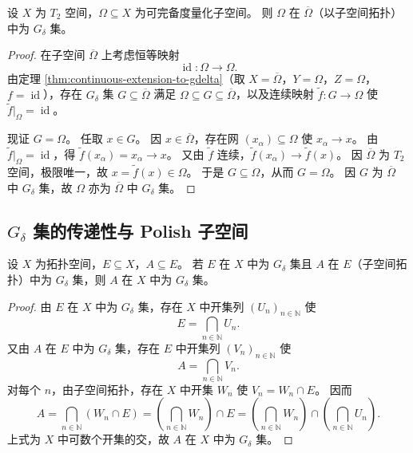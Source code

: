 \documentclass[lang=cn,a4paper,newtx,figureplace=section,tableplace=section]{elegantbook}
\begin{document}
\begin{theorem}\label{thm:completely-metrizable-gdelta-in-closure}
  设 $X$ 为 $T_2$ 空间，$\Omega\subseteq X$ 为可完备度量化子空间。
  则 $\Omega$ 在 $\overline{\Omega}$（以子空间拓扑）中为 $G_\delta$ 集。
\end{theorem}
\begin{proof}
  在子空间 $\overline{\Omega}$ 上考虑恒等映射
  \[
    \operatorname{id}:\Omega\to\Omega.
  \]
  由定理 \ref{thm:continuous-extension-to-gdelta}（取 $X=\overline{\Omega}$，$Y=\Omega$，$Z=\Omega$，$f=\operatorname{id}$），存在 $G_\delta$ 集 $G\subseteq\overline{\Omega}$ 满足 $\Omega\subseteq G\subseteq\overline{\Omega}$，以及连续映射 $\widetilde f:G\to\Omega$ 使 $\widetilde f\vert_{\Omega}=\operatorname{id}$。

  现证 $G=\Omega$。
  任取 $x\in G$。
  因 $x\in\overline{\Omega}$，存在网 $(x_\alpha)\subseteq\Omega$ 使 $x_\alpha\to x$。
  由 $\widetilde f\vert_{\Omega}=\operatorname{id}$，得 $\widetilde f(x_\alpha)=x_\alpha\to x$。
  又由 $\widetilde f$ 连续，$\widetilde f(x_\alpha)\to\widetilde f(x)$。
  因 $\overline{\Omega}$ 为 $T_2$ 空间，极限唯一，故 $x=\widetilde f(x)\in\Omega$。
  于是 $G\subseteq\Omega$，从而 $G=\Omega$。
  因 $G$ 为 $\overline{\Omega}$ 中 $G_\delta$ 集，故 $\Omega$ 亦为 $\overline{\Omega}$ 中 $G_\delta$ 集。
\end{proof}

\subsection{$G_\delta$ 集的传递性与 Polish 子空间}

\begin{proposition}\label{prop:gdelta-transitivity}
  设 $X$ 为拓扑空间，$E\subseteq X$，$A\subseteq E$。
  若 $E$ 在 $X$ 中为 $G_\delta$ 集且 $A$ 在 $E$（子空间拓扑）中为 $G_\delta$ 集，则 $A$ 在 $X$ 中为 $G_\delta$ 集。
\end{proposition}
\begin{proof}
  由 $E$ 在 $X$ 中为 $G_\delta$ 集，存在 $X$ 中开集列 $(U_n)_{n\in\mathbb{N}}$ 使
  \[
    E=\bigcap_{n\in\mathbb{N}}U_n.
  \]
  又由 $A$ 在 $E$ 中为 $G_\delta$ 集，存在 $E$ 中开集列 $(V_n)_{n\in\mathbb{N}}$ 使
  \[
    A=\bigcap_{n\in\mathbb{N}}V_n.
  \]
  对每个 $n$，由子空间拓扑，存在 $X$ 中开集 $W_n$ 使 $V_n=W_n\cap E$。
  因而
  \[
    A=\bigcap_{n\in\mathbb{N}}(W_n\cap E)=\left(\bigcap_{n\in\mathbb{N}}W_n\right)\cap E=\left(\bigcap_{n\in\mathbb{N}}W_n\right)\cap\left(\bigcap_{n\in\mathbb{N}}U_n\right).
  \]
  上式为 $X$ 中可数个开集的交，故 $A$ 在 $X$ 中为 $G_\delta$ 集。
\end{proof}
\end{document}
